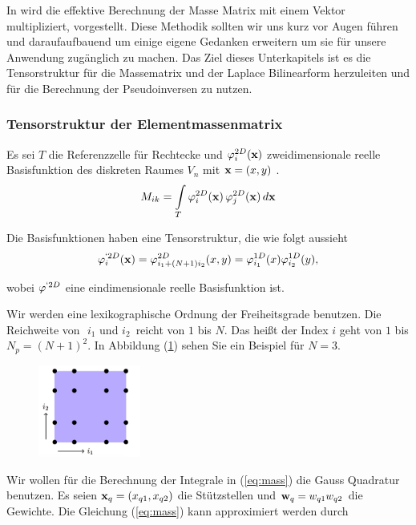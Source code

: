 In \cite{Teachlet} wird die effektive Berechnung der Masse Matrix mit einem Vektor multipliziert, vorgestellt. Diese Methodik sollten wir uns kurz vor Augen führen und daraufaufbauend um einige eigene Gedanken erweitern um sie für unsere Anwendung zugänglich zu machen.
Das Ziel dieses Unterkapitels ist es die Tensorstruktur für die Massematrix und der Laplace Bilinearform herzuleiten und für die Berechnung der Pseudoinversen zu nutzen. 

\subsubsection{Tensorstruktur der Elementmassenmatrix}
Es sei $T$ die Referenzzelle für Rechtecke und $\varphi^{2D}_i(\bold{x})$ zweidimensionale reelle Basisfunktion des diskreten Raumes $V_n$ mit $\bold{x}=(x,y)$ .
\begin{equation} \label{eq:mass}
M_{ik} = \int\limits_{T} \varphi^{2D}_i (\bold{x}) \, \varphi^{2D}_j (\bold{x}) \, d\bold{x}
\end{equation}

Die Basisfunktionen haben eine Tensorstruktur, die wie folgt aussieht
\begin{equation} \label{eq:tensor}
\varphi^{`2D}_i(\bold{x})=\varphi^{2D}_{i_1+(N+1)i_2}(x,y)=\varphi^{1D}_{i_1}(x)\varphi^{1D}_{i_2}(y),
\end{equation}

wobei $\varphi^{`2D}$ eine eindimensionale reelle Basisfunktion ist.

Wir werden eine lexikographische Ordnung der Freiheitsgrade benutzen. Die Reichweite von $\, \, i_1 $ und $ i_2 \, $ reicht von $1$ bis $N$. Das heißt der Index $i$ geht von $1$ bis $N_p=(N+1)^2$. In Abbildung (\ref{fig:lexi}) sehen Sie ein Beispiel für $N=3$.

\begin{figure}[ht] 
	\centering
  \includegraphics[width=0.3\textwidth]{lexi.png}
	\caption{ \cite[3]{Teachlet}}
	\label{fig:lexi}
\end{figure}

Wir wollen für die Berechnung der Integrale in (\ref{eq:mass}) die Gauss Quadratur benutzen.
Es seien $\bold{x}_q=(x_{q1},x_{q2})$ die Stützstellen und $\bold{w}_q=w_{q1}w_{q2}$ die Gewichte. Die Gleichung (\ref{eq:mass}) kann approximiert werden durch

